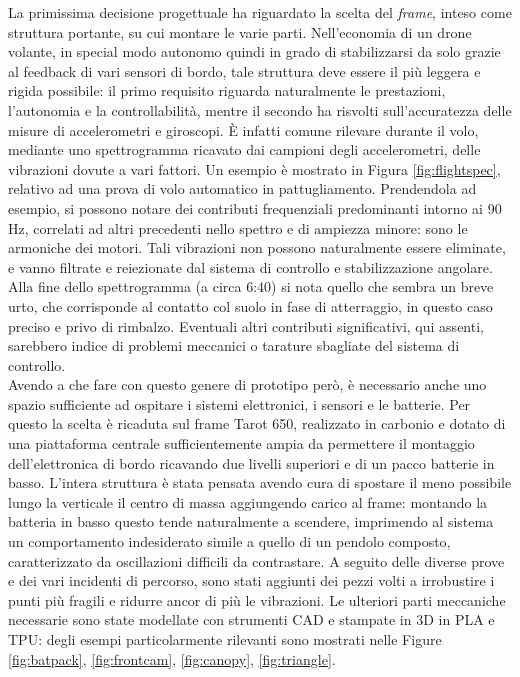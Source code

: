 \indent La primissima decisione progettuale ha riguardato la scelta del \emph{frame}, inteso come struttura portante, su cui montare le varie parti. Nell'economia di un drone volante, in special modo autonomo quindi in grado di stabilizzarsi da solo grazie al feedback di vari sensori di bordo, tale struttura deve essere il più leggera e rigida possibile: il primo requisito riguarda naturalmente le prestazioni, l'autonomia e la controllabilità, mentre il secondo ha risvolti sull'accuratezza delle misure di accelerometri e giroscopi. È infatti comune rilevare durante il volo, mediante uno spettrogramma ricavato dai campioni degli accelerometri, delle vibrazioni dovute a vari fattori. Un esempio è mostrato in Figura \ref{fig:flightspec}, relativo ad una prova di volo automatico in pattugliamento. Prendendola ad esempio, si possono notare dei contributi frequenziali predominanti intorno ai 90 Hz, correlati ad altri precedenti nello spettro e di ampiezza minore: sono le armoniche dei motori. Tali vibrazioni non possono naturalmente essere eliminate, e vanno filtrate e reiezionate dal sistema di controllo e stabilizzazione angolare. Alla fine dello spettrogramma (a circa 6:40) si nota quello che sembra un breve urto, che corrisponde al contatto col suolo in fase di atterraggio, in questo caso preciso e privo di rimbalzo. Eventuali altri contributi significativi, qui assenti, sarebbero indice di problemi meccanici o tarature sbagliate del sistema di controllo.\\
Avendo a che fare con questo genere di prototipo però, è necessario anche uno spazio sufficiente ad ospitare i sistemi elettronici, i sensori e le batterie. Per questo la scelta è ricaduta sul frame Tarot 650, realizzato in carbonio e dotato di una piattaforma centrale sufficientemente ampia da permettere il montaggio dell'elettronica di bordo ricavando due livelli superiori e di un pacco batterie in basso. L'intera struttura è stata pensata avendo cura di spostare il meno possibile lungo la verticale il centro di massa aggiungendo carico al frame: montando la batteria in basso questo tende naturalmente a scendere, imprimendo al sistema un comportamento indesiderato simile a quello di un pendolo composto, caratterizzato da oscillazioni difficili da contrastare. A seguito delle diverse prove e dei vari incidenti di percorso, sono stati aggiunti dei pezzi volti a irrobustire i punti più fragili e ridurre ancor di più le vibrazioni. Le ulteriori parti meccaniche necessarie sono state modellate con strumenti CAD e stampate in 3D in PLA e TPU: degli esempi particolarmente rilevanti sono mostrati nelle Figure \ref{fig:batpack}, \ref{fig:frontcam}, \ref{fig:canopy}, \ref{fig:triangle}.\\
